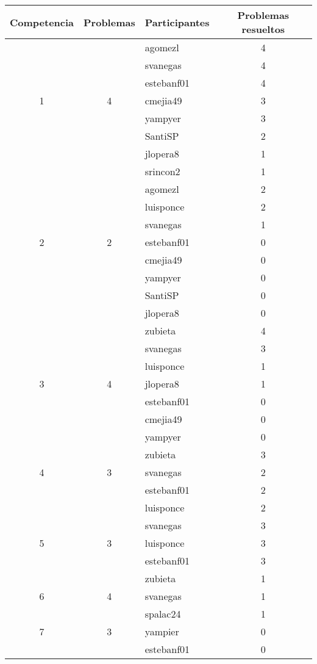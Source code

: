 \documentclass[conference]{IEEEtran}
\begin{document}
\begin{table}
	\centering
	\begin{tabular}{|c|c|l|c|}
		\hline
		\textbf{Competencia} & \textbf{Problemas} & \textbf{Participantes} & \textbf{Problemas resueltos} \\
		\hline
		  &   & agomezl  & 4\\
		  &   & svanegas & 4\\
		  &   & estebanf01 & 4\\
		1 & 4 & cmejia49 & 3\\
		  &   & yampyer & 3\\
		  &   & SantiSP & 2\\
		  &   & jlopera8 & 1\\
		  &   & srincon2 & 1\\
		\hline
		  &   & agomezl  & 2\\
		  &   & luisponce & 2\\
		  &   & svanegas & 1\\
		2 & 2 & estebanf01 & 0\\
		  &   & cmejia49 & 0\\
		  &   & yampyer & 0\\
		  &   & SantiSP & 0\\
		  &   & jlopera8 & 0\\
		\hline
		  &   & zubieta  & 4\\
		  &   & svanegas & 3\\
		  &   & luisponce & 1\\
		3 & 4 & jlopera8 & 1\\
		  &   & estebanf01 & 0\\
		  &   & cmejia49 & 0\\
		  &   & yampyer & 0\\
		\hline
		  &   & zubieta  & 3\\
		4 & 3 & svanegas & 2\\
		  &   & estebanf01 & 2\\
		  &   & luisponce & 2\\
		\hline 
		  &   & svanegas  & 3\\
		5 & 3 & luisponce & 3\\
		  &   & estebanf01 & 3\\
		  &   & zubieta & 1\\
		\hline
		6 & 4 & svanegas & 1\\
		  &   & spalac24 & 1\\
		\hline
		7 & 3 & yampier & 0\\
		  &   & estebanf01 & 0\\

\end{tabular}
\end{table}
\end{document}
